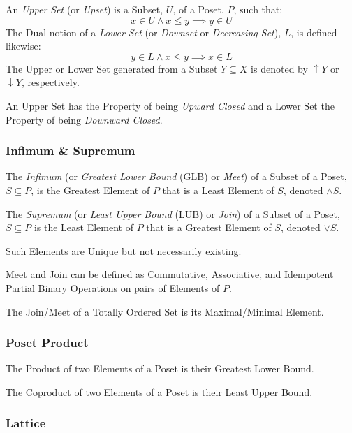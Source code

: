 \documentclass{article}
\begin{document}
An \emph{Upper Set} (or \emph{Upset}) is a Subset, $U$, of a Poset,
$P$, such that:
\[
    x \in U \wedge x \leq y \implies y \in U
\]
The Dual notion of a \emph{Lower Set} (or \emph{Downset} or
\emph{Decreasing Set}), $L$, is defined likewise:
\[
    y \in L \wedge x \leq y \implies x \in L
\]
The Upper or Lower Set generated from a Subset $Y \subseteq X$ is
denoted by $\uparrow Y$ or $\downarrow Y$, respectively.

An Upper Set has the Property of being \emph{Upward Closed} and a
Lower Set the Property of being \emph{Downward Closed}.



\subsubsection{Infimum \& Supremum}\label{subsec:glb_lub}

The \emph{Infimum} (or \emph{Greatest Lower Bound} (GLB) or
\emph{Meet}) of a Subset of a Poset, $S \subseteq P$, is the Greatest
Element of $P$ that is a Least Element of $S$, denoted $\wedge S$.

The \emph{Supremum} (or \emph{Least Upper Bound} (LUB) or \emph{Join})
of a Subset of a Poset, $S \subseteq P$ is the Least Element of $P$
that is a Greatest Element of $S$, denoted $\vee S$.

Such Elements are Unique but not necessarily existing.

Meet and Join can be defined as Commutative, Associative, and
Idempotent Partial Binary Operations on pairs of Elements of $P$.

The Join/Meet of a Totally Ordered Set is its Maximal/Minimal Element.



\subsubsection{Poset Product}\label{subsec:poset_product}

The Product of two Elements of a Poset is their Greatest Lower Bound.

The Coproduct of two Elements of a Poset is their Least Upper Bound.



\subsubsection{Lattice}\label{subsec:lattice}
\end{document}
